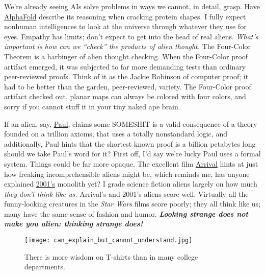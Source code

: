 We're already seeing AIs solve problems in ways we cannot, in detail,
grasp. Have
\href{https://www.deepmind.com/research/highlighted-research/alphafold}{AlphaFold}
describe its reasoning when cracking protein shapes. I fully expect
nonhuman intelligences to look at the universe through whatever they use
for eyes. Empathy has limits; don't expect to get into the head of real
aliens. \emph{What's important is how can we ``check'' the products of
alien thought.} The Four-Color Theorem is a harbinger of alien thought
checking. When the Four-Color proof artifact emerged, it was subjected
to far more demanding tests than ordinary peer-reviewed proofs. Think of
it as the \href{https://jackierobinson.com/}{Jackie Robinson} of
computer proof; it had to be better than the garden, peer-reviewed,
variety. The Four-Color proof artifact checked out, planar maps can
always be colored with four colors, and sorry if you cannot stuff it in
your tiny naked ape brain.

If an alien, say, \href{https://www.imdb.com/title/tt1092026/}{Paul},
claims some SOMESHIT is a valid consequence of a theory founded on a
trillion axioms, that uses a totally nonstandard logic, and
additionally, Paul hints that the shortest known proof is a billion
petabytes long should we take Paul's word for it? First off, I'd say
we're lucky Paul uses a formal system. Things could be far more opaque.
The excellent film \href{https://www.imdb.com/title/tt2543164/}{Arrival}
hints at just how freaking incomprehensible aliens might be, which
reminds me, has anyone explained
\href{https://www.imdb.com/title/tt0062622/}{2001's} monolith yet? I
grade science fiction aliens largely on how much \emph{they don't think
like us.} Arrival's and 2001's aliens score well. Virtually all the
funny-looking creatures in the \emph{Star Wars} films score poorly; they
all think like us; many have the same sense of fashion and humor.
\emph{\textbf{Looking strange does not make you alien: thinking strange
does!}}

\captionsetup[figure]{labelformat=empty}
\begin{figure}[htbp]
\centering
\texttt{[image: can\_explain\_but\_cannot\_understand.jpg]}
\caption[T-shirt wisdom]{There is more wisdom on T-shirts than in many college departments.}
\label{fig:7333x0}
\end{figure}

